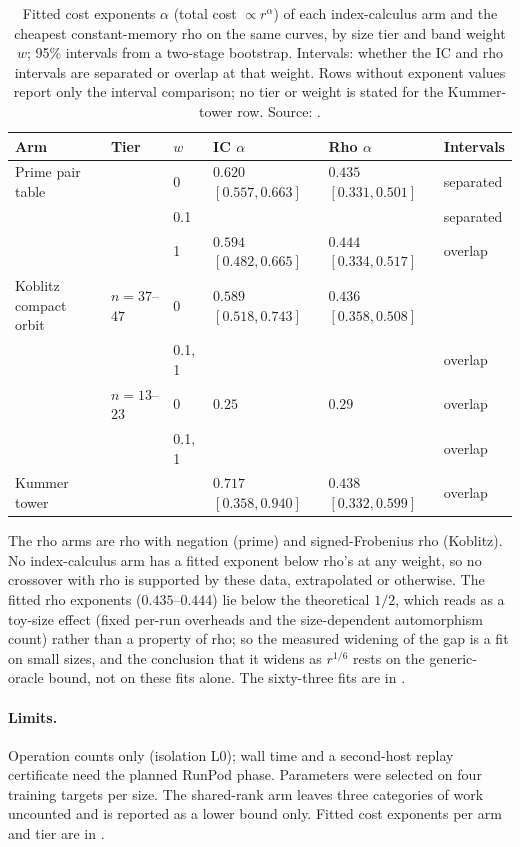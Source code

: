 \begin{table}[t]
\centering\small
\begin{tabular}{@{}llllll@{}}
\toprule
Arm & Tier & $w$ & IC $\alpha$ & Rho $\alpha$ & Intervals \\
\midrule
Prime pair table & & 0 & $0.620$ $[0.557,0.663]$ & $0.435$ $[0.331,0.501]$ & separated \\
 & & 0.1 & & & separated \\
 & & 1 & $0.594$ $[0.482,0.665]$ & $0.444$ $[0.334,0.517]$ & overlap \\
\addlinespace
Koblitz compact orbit & $n=37$--$47$ & 0 & $0.589$ $[0.518,0.743]$ & $0.436$ $[0.358,0.508]$ & \\
 & & 0.1, 1 & & & overlap \\
 & $n=13$--$23$ & 0 & $0.25$ & $0.29$ & overlap \\
 & & 0.1, 1 & & & overlap \\
\addlinespace
Kummer tower & & & $0.717$ $[0.358,0.940]$ & $0.438$ $[0.332,0.599]$ & overlap \\
\bottomrule
\end{tabular}
\caption[]{Fitted cost exponents $\alpha$ (total cost $\propto r^\alpha$)
of each index-calculus arm and the cheapest constant-memory rho on the same
curves, by size tier and band weight $w$; 95\% intervals from a two-stage
bootstrap. Intervals: whether the IC and rho intervals are separated or
overlap at that weight. Rows without exponent values report only the
interval comparison; no tier or weight is stated for the Kummer-tower
row. Source:
.}
\label{tab:prog_frontier-exponents}
\end{table}

\noindent The rho arms are rho with negation (prime) and signed-Frobenius
rho (Koblitz). No index-calculus arm has a fitted exponent below rho's at any weight, so
no crossover with rho is supported by these data, extrapolated or
otherwise. The fitted rho exponents ($0.435$--$0.444$) lie below the
theoretical $1/2$, which reads as a toy-size effect (fixed per-run overheads
and the size-dependent automorphism count) rather than a property of rho; so
the measured widening of the gap is a fit on small sizes, and the conclusion
that it widens as $r^{1/6}$ rests on the generic-oracle bound, not on these
fits alone. The sixty-three fits are in
.

\paragraph{Limits.} Operation counts only (isolation L0); wall time and a
second-host replay certificate need the planned RunPod phase. Parameters
were selected on four training targets per size. The shared-rank arm
leaves three categories of work uncounted and is reported as a lower
bound only. Fitted cost exponents per arm and tier are in
.

